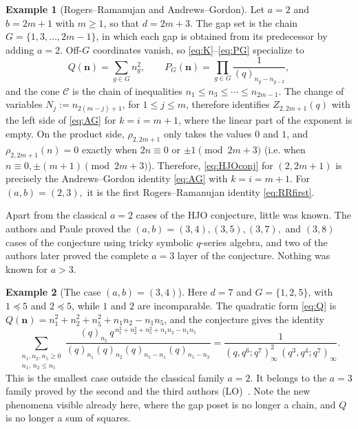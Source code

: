 \documentclass[12pt,reqno]{amsart}
\numberwithin{equation}{section}
\theoremstyle{definition}
\newtheorem*{example}{Example}
\theoremstyle{remark}
\theoremstyle{plain}
\newcommand{\nn}{\mathbf n}
\begin{document}
\begin{example}[Rogers--Ramanujan and Andrews--Gordon]\label{ex:classical}
Let $a=2$ and $b=2m+1$ with $m\ge1$, so that $d=2m+3$. The gap set is the chain $G=\{1,3,\ldots,2m-1\}$, in which each gap is obtained from its predecessor by adding $a=2$. Off-$G$ coordinates vanish, so \eqref{eq:K}--\eqref{eq:PG} specialize to
\[
 Q(\nn)=\sum_{g\in G}n_g^2,\qquad
 P_G(\nn)=\prod_{g\in G}\frac{1}{(q)_{n_g-n_{g-2}}},
\]
and the cone $\mathcal C$ is the chain of inequalities $n_1\le n_3\le\cdots\le n_{2m-1}$. The change of variables $N_j:=n_{2(m-j)+1}$, for $1\le j\le m$, therefore identifies $Z_{2,2m+1}(q)$ with the left side of \eqref{eq:AG} for $k=i=m+1$, where the linear part of the exponent is empty. On the product side, $\rho_{2,2m+1}$ only takes the values $0$ and $1$, and $\rho_{2,2m+1}(n)=0$ exactly when $2n\equiv0$ or $\pm1\pmod{2m+3}$ (i.e. when $n\equiv0,\pm(m+1)\pmod{2m+3}$). Therefore, \eqref{eq:HJOconj} for $(2,2m+1)$ is precisely the Andrews--Gordon identity \eqref{eq:AG} with $k=i=m+1$. For  $(a,b)=(2,3),$ it is the first Rogers--Ramanujan identity \eqref{eq:RRfirst}. 
\end{example}

Apart from the classical $a=2$ cases of the HJO conjecture, little was known. The authors and Paule \cite{HLOP} proved the $(a,b)=(3, 4), (3, 5), (3,7),$ and $(3,8)$ cases of the conjecture using tricky symbolic $q$-series algebra, and two of the authors \cite{LO} later proved the complete $a=3$ layer of the conjecture. Nothing was known for $a>3.$

\begin{example}[The case $(a,b)=(3,4)$]\label{ex:34}
Here $d=7$ and $G=\{1,2,5\}$, with $1\preceq5$ and $2\preceq5$, while $1$ and $2$ are incomparable. The quadratic form \eqref{eq:Q} is $Q(\nn)=n_1^2+n_2^2+n_5^2+n_1n_2-n_1n_5$, and the conjecture gives the identity
\begin{equation}\label{eq:example34}
 \sum_{\substack{n_1,n_2,n_5\ge0\\ n_1,\,n_2\le n_5}}
 \frac{(q)_{n_5}\,q^{\,n_1^2+n_2^2+n_5^2+n_1n_2-n_1n_5}}
      {(q)_{n_1}(q)_{n_2}(q)_{n_5-n_1}(q)_{n_5-n_2}}
 =\frac{1}{(q,q^{6};q^{7})_\infty^{2}\,(q^{3},q^{4};q^{7})_\infty}.
\end{equation}
This is the smallest case outside the classical family $a=2$. It belongs to the $a=3$ family proved by the second and the third authors (LO)~\cite{LO}. Note the new phenomena visible already here, where the gap poset is no longer a chain, and $Q$ is no longer a sum of squares.
\end{example}
\end{document}
